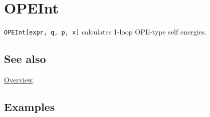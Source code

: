 \documentclass[../FeynCalcManual.tex]{subfiles}
\begin{document}
\hypertarget{opeint}{%
\section{OPEInt}\label{opeint}}

\texttt{OPEInt[\allowbreak{}expr,\ \allowbreak{}q,\ \allowbreak{}p,\ \allowbreak{}x]}
calculates 1-loop OPE-type self energies.

\subsection{See also}

\hyperlink{toc}{Overview}.

\subsection{Examples}
\end{document}
